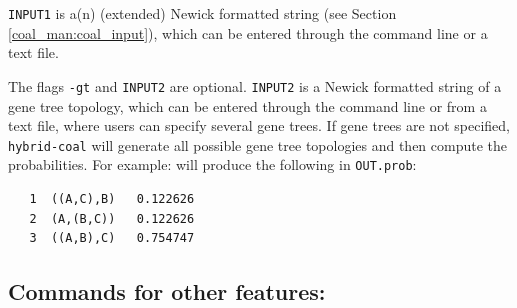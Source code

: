 {\tt INPUT1} is a(n) (extended) Newick formatted string (see Section \ref{coal_man:coal_input}), which can be entered through the command line or a text file.

The flags {\tt -gt} and {\tt INPUT2} are optional. {\tt INPUT2} is a Newick formatted string of a gene tree topology, which can be entered through the command line or from a text file, where users can specify several gene trees. If gene trees are not specified, {\tt hybrid-coal} will generate all possible gene tree topologies and then compute the probabilities. For example:
will produce the following in {\tt OUT.prob}:
\begin{verbatim}
   1  ((A,C),B)   0.122626
   2  (A,(B,C))   0.122626
   3  ((A,B),C)   0.754747
\end{verbatim}





\subsection{Commands for other features:}
